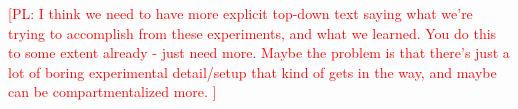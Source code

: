 \documentclass[11pt,letterpaper]{article}
\newcommand{\regex}{\textsc{Regex}\xspace}
\newcommand\pl[1]{\textcolor{red}{[PL: #1]}}
\begin{document}
%
%
%

\pl{I think we need to have more explicit top-down text saying what we're
  trying to accomplish from these experiments, and what we learned.  You do
  this to some extent already - just need more.
  Maybe the problem is that there's just a lot of boring experimental detail/setup
  that kind of gets in the way, and maybe can be compartmentalized more.
}
\end{document}
